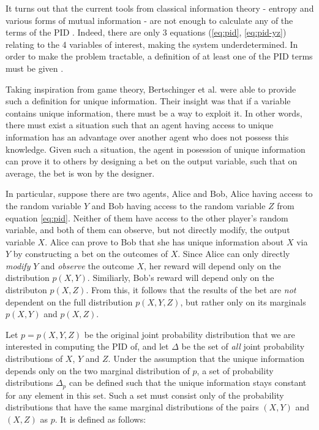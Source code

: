 \documentclass[12pt]{article}
\begin{document}
It turns out that the current tools from classical information theory - entropy and various forms of mutual information - are not enough to calculate any of the terms of the PID \cite{williams-beer}. Indeed, there are only 3 equations (\ref{eq:pid}, \ref{eq:pid-yz}) relating to the 4 variables of interest, making the system underdetermined. In order to make the problem tractable, a definition of at least one of the PID terms must be given \cite{bertschinger}.

Taking inspiration from game theory, Bertschinger et al. \cite{bertschinger} were able to provide such a definition for unique information. Their insight was that if a variable contains unique information, there must be a way to exploit it. In other words, there must exist a situation such that an agent having access to unique information has an advantage over another agent who does not possess this knowledge. Given such a situation, the agent in posession of unique information can prove it to others by designing a bet on the output variable, such that on average, the bet is won by the designer.

In particular, suppose there are two agents, Alice and Bob, Alice having access to the random variable $Y$ and Bob having access to the random variable $Z$ from equation \ref{eq:pid}. Neither of them have access to the other player's random variable, and both of them can observe, but not directly modify, the output variable $X$. Alice can prove to Bob that she has unique information about $X$ via $Y$ by constructing a bet on the outcomes of $X$. Since Alice can only directly \textit{modify} $Y$ and \textit{observe} the outcome $X$, her reward will depend only on the distribution $p(X,Y)$. Similiarly, Bob's reward will depend only on the distributon $p(X,Z)$. From this, it follows that the results of the bet are \textit{not} dependent on the full distribution $p(X,Y,Z)$, but rather only on its marginals $p(X,Y)$ and $p(X,Z)$.

Let $p = p(X,Y,Z)$ be the original joint probability distribution  that we are interested in computing the PID of, and let $\Delta$ be the set of \textit{all} joint probability distributions of $X$, $Y$ and $Z$. Under the assumption that the unique information depends only on the two marginal distribution of $p$, a set of probability distributions $\Delta_p$ can be defined such that the unique information stays constant for any element in this set. Such a set must consist only of the probability distributions that have the same marginal distributions of the pairs $(X,Y)$ and $(X,Z)$ as $p$. It is defined as follows: 
\end{document}
